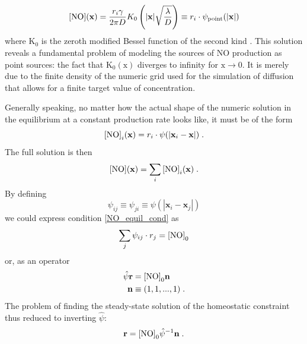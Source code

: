 \documentclass[10pt,letterpaper]{article}
\begin{document}
\begin{equation}
{\rm [NO]}(\mathbf{x}) = \frac{r_i \gamma}{2 \pi D} K_0 \left(|\mathbf{x}|\sqrt{\frac{\lambda}{D}} \right) \equiv r_i \cdot \psi_{\rm point}(|\mathbf{x}|)
\label{solution_diff_equil_bessel}
\end{equation}
where $\mathrm{K_0}$ is the zeroth modified Bessel function of the second kind \cite{Helmholtz_Solution_2d}.  This solution reveals a fundamental problem of modeling the sources of NO production as point sources: the fact that $\mathrm{K_0(x)}$ diverges to infinity for $\mathrm{x\rightarrow 0}$. It is merely due to the finite density of the numeric grid used for the simulation of diffusion that allows for a finite target value of concentration.

Generally speaking, no matter how the actual shape of the numeric solution in the equilibrium at a constant production rate looks like, it must be of the form
\begin{equation}
{\rm [NO]}_i(\mathbf{x}) = r_i \cdot \psi (|\mathbf{x}_{i}-\mathbf{x}|) \;  . \label{general_diff_interaction}
\end{equation}
The full solution is then
\begin{equation}
{\rm [NO]}(\mathbf{x}) = \sum_i {\rm [NO]}_i(\mathbf{x})\;.
\label{full_sol_diff_equil}
\end{equation}
By defining
\begin{equation}
\psi_{ij} \equiv \psi_{ji} \equiv \psi (|\mathbf{x}_i-\mathbf{x}_j|)
\label{interact_matrix_elements}
\end{equation}
we could express condition \eqref{NO_equil_cond} as
\begin{equation}
\sum_j \psi_{ij}\cdot r_j = {\rm [NO]}_0
\label{NO_equil_cond_interact_matrix}
\end{equation}
or, as an operator
\begin{align}
\hat{\psi}\mathbf{r} &= {\rm [NO]}_0 \mathbf{n} \label{NO_equil_cond_interact_matrix_operator} \\
\mathbf{n}&\equiv (1,1,...,1) \; .
\end{align}
The problem of finding the steady-state solution of the homeostatic constraint thus reduced to inverting $\hat{\psi}$:
\begin{equation}
\mathbf{r} = {\rm [NO]}_0 \hat{\psi}^{-1} \mathbf{n} \; .
\label{NO_euqil_cond_interact_matrix_operator_solve}
\end{equation}
\end{document}
